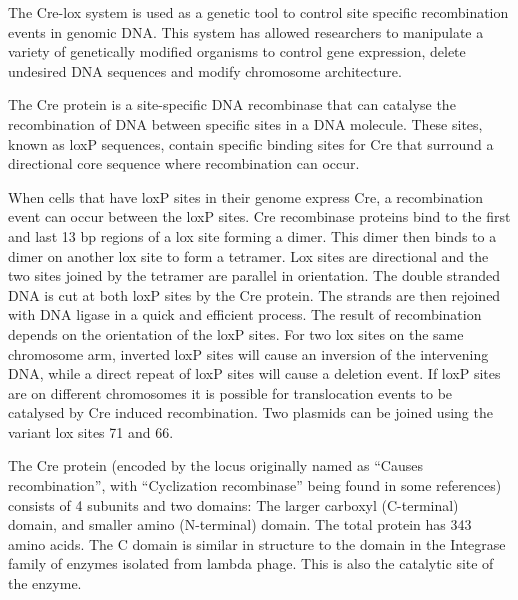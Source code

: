 The Cre-lox system is used as a genetic tool to control site specific recombination events in genomic DNA. This system has allowed researchers to manipulate a variety of genetically modified organisms to control gene expression, delete undesired DNA sequences and modify chromosome architecture.

The Cre protein is a site-specific DNA recombinase that can catalyse the recombination of DNA between specific sites in a DNA molecule. These sites, known as loxP sequences, contain specific binding sites for Cre that surround a directional core sequence where recombination can occur.

When cells that have loxP sites in their genome express Cre, a recombination event can occur between the loxP sites. Cre recombinase proteins bind to the first and last 13 bp regions of a lox site forming a dimer. This dimer then binds to a dimer on another lox site to form a tetramer. Lox sites are directional and the two sites joined by the tetramer are parallel in orientation. The double stranded DNA is cut at both loxP sites by the Cre protein. The strands are then rejoined with DNA ligase in a quick and efficient process. The result of recombination depends on the orientation of the loxP sites. For two lox sites on the same chromosome arm, inverted loxP sites will cause an inversion of the intervening DNA, while a direct repeat of loxP sites will cause a deletion event. If loxP sites are on different chromosomes it is possible for translocation events to be catalysed by Cre induced recombination. Two plasmids can be joined using the variant lox sites 71 and 66.

The Cre protein (encoded by the locus originally named as ``Causes recombination'', with ``Cyclization recombinase'' being found in some references) consists of 4 subunits and two domains: The larger carboxyl (C-terminal) domain, and smaller amino (N-terminal) domain. The total protein has 343 amino acids. The C domain is similar in structure to the domain in the Integrase family of enzymes isolated from lambda phage. This is also the catalytic site of the enzyme.

